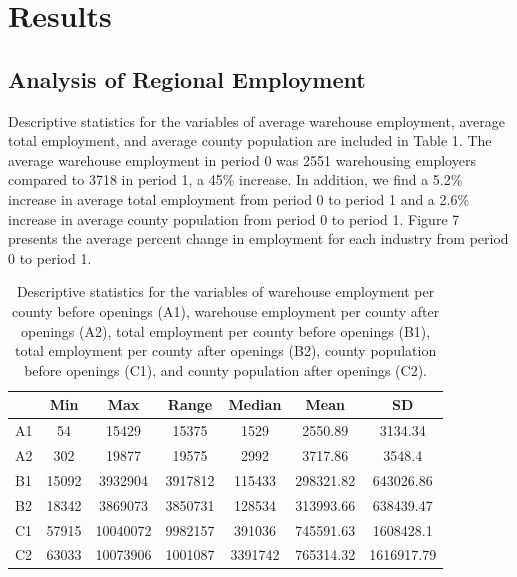 \documentclass[11pt]{article}
\begin{document}
\section{Results}


\subsection{Analysis of Regional Employment}

\-\hspace{0.5cm} Descriptive statistics for the variables of average warehouse employment, average total employment, and average county population are included in Table 1. The average warehouse employment in period 0 was 2551 warehousing employers compared to 3718 in period 1, a 45\% increase. In addition, we find a 5.2\% increase in average total employment from period 0 to period 1 and a 2.6\% increase in average county population from period 0 to period 1. Figure 7 presents the average percent change in employment for each industry from period 0 to period 1.

\begin{table}[H]
\centering
\begin{tabular}[H]{lcccccc}
\toprule
&Min&Max&Range&Median&Mean&SD\\
\midrule
A1&54&15429&15375&1529&2550.89&3134.34\\
A2&302&19877&19575&2992&3717.86&3548.4\\
B1&15092&3932904&3917812&115433&298321.82&643026.86\\
B2&18342&3869073&3850731&128534&313993.66&638439.47\\
C1&57915&10040072&9982157&391036&745591.63&1608428.1\\
C2&63033&10073906&1001087&3391742&765314.32&1616917.79\\
\bottomrule
\end{tabular}
\caption{Descriptive statistics for the variables of warehouse employment per county before openings (A1), warehouse employment per county after openings (A2), total employment per county before openings (B1), total employment per county after openings (B2), county population before openings (C1), and county population after openings (C2).}
\end{table}%
\end{document}
